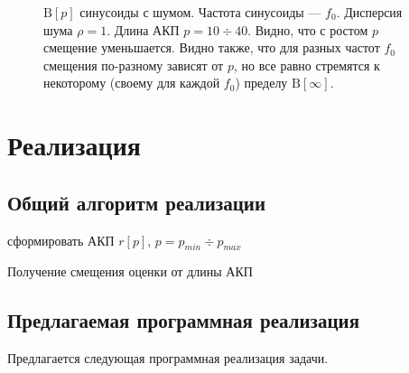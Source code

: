     \begin{figure}
        \centering
        \captionsetup[subfigure]{labelformat=empty}
        \caption{${\mathrm B}\left[p\right]$ синусоиды с шумом. Частота синусоиды --- $f_0$. Дисперсия шума $\rho=1$. Длина АКП $p=10 \div 40$. Видно, что с ростом $p$ смещение уменьшается. Видно также, что для разных частот $f_0$ смещения по-разному зависят от $p$, но все равно стремятся к некоторому (своему для каждой $f_0$) пределу ${\mathrm B}\left[\infty\right]$.}
        \label{fig:pmd_f015025045_r1}
    \end{figure}



    \section{Реализация}

    \subsection{Общий алгоритм реализации}

    \begin{algorithm}
        сформировать АКП $r\left[p\right]$, $p = p_{min} \div p_{max}$\;
        \caption{Получение смещения оценки от длины АКП \label{algo:general}}
    \end{algorithm}

    \subsection{Предлагаемая программная реализация}

    Предлагается следующая программная реализация задачи.

